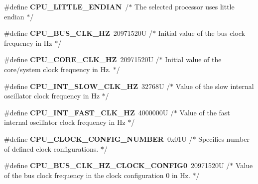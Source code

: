 \begin{DoxyCompactItemize}
\item 
\#define {\bfseries C\+P\+U\+\_\+\+L\+I\+T\+T\+L\+E\+\_\+\+E\+N\+D\+I\+AN}~/$\ast$ The selected processor uses little endian $\ast$/\hypertarget{group___c_p_u___config__module_gab62ca27d0a6a531f35842a6e3a94b454}{}\label{group___c_p_u___config__module_gab62ca27d0a6a531f35842a6e3a94b454}

\item 
\#define {\bfseries C\+P\+U\+\_\+\+B\+U\+S\+\_\+\+C\+L\+K\+\_\+\+HZ}~20971520\+U /$\ast$ Initial value of the bus clock frequency in Hz $\ast$/\hypertarget{group___c_p_u___config__module_ga532954dc988486bfe48200c796380120}{}\label{group___c_p_u___config__module_ga532954dc988486bfe48200c796380120}

\item 
\#define {\bfseries C\+P\+U\+\_\+\+C\+O\+R\+E\+\_\+\+C\+L\+K\+\_\+\+HZ}~20971520\+U /$\ast$ Initial value of the core/system clock frequency in Hz.  $\ast$/\hypertarget{group___c_p_u___config__module_ga9dee0abd722c849e54c662ab11a1d2cf}{}\label{group___c_p_u___config__module_ga9dee0abd722c849e54c662ab11a1d2cf}

\item 
\#define {\bfseries C\+P\+U\+\_\+\+I\+N\+T\+\_\+\+S\+L\+O\+W\+\_\+\+C\+L\+K\+\_\+\+HZ}~32768\+U /$\ast$ Value of the slow internal oscillator clock frequency in Hz  $\ast$/\hypertarget{group___c_p_u___config__module_ga925e4835a9fdb52f03bd354d62d6ba0a}{}\label{group___c_p_u___config__module_ga925e4835a9fdb52f03bd354d62d6ba0a}

\item 
\#define {\bfseries C\+P\+U\+\_\+\+I\+N\+T\+\_\+\+F\+A\+S\+T\+\_\+\+C\+L\+K\+\_\+\+HZ}~4000000\+U /$\ast$ Value of the fast internal oscillator clock frequency in Hz  $\ast$/\hypertarget{group___c_p_u___config__module_ga741ad9275688de8051f4bebd98a682bc}{}\label{group___c_p_u___config__module_ga741ad9275688de8051f4bebd98a682bc}

\item 
\#define {\bfseries C\+P\+U\+\_\+\+C\+L\+O\+C\+K\+\_\+\+C\+O\+N\+F\+I\+G\+\_\+\+N\+U\+M\+B\+ER}~0x01\+U /$\ast$ Specifies number of defined clock configurations. $\ast$/\hypertarget{group___c_p_u___config__module_ga37d43e31f65dd620040aec363e95b5a8}{}\label{group___c_p_u___config__module_ga37d43e31f65dd620040aec363e95b5a8}

\item 
\#define {\bfseries C\+P\+U\+\_\+\+B\+U\+S\+\_\+\+C\+L\+K\+\_\+\+H\+Z\+\_\+\+C\+L\+O\+C\+K\+\_\+\+C\+O\+N\+F\+I\+G0}~20971520\+U /$\ast$ Value of the bus clock frequency in the clock configuration 0 in Hz. $\ast$/\hypertarget{group___c_p_u___config__module_ga39018ca5854bea36700d3b30f6c08195}{}\label{group___c_p_u___config__module_ga39018ca5854bea36700d3b30f6c08195}


\end{DoxyCompactItemize}
